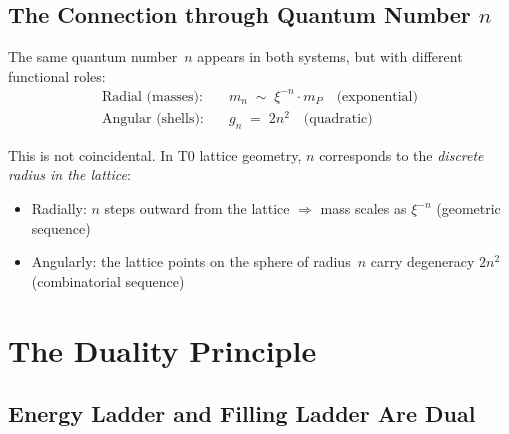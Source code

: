 \begin{table}[htbp]
\centering
\caption{Shell structure and the periodic table}
\label{tab:shells}
\end{table}

\subsection{The Connection through Quantum Number \texorpdfstring{$n$}{n}}
\label{subsec:connection-n}

The same quantum number~$n$ appears in both systems, but with different
functional roles:
\begin{align}
  \text{Radial (masses):}  &\quad m_n \;\sim\; \xi^{-n} \cdot m_P
    \quad\text{(exponential)} \\
  \text{Angular (shells):} &\quad g_n \;=\; 2n^2
    \quad\text{(quadratic)}
\end{align}

This is not coincidental. In T0 lattice geometry, $n$ corresponds to the
\emph{discrete radius in the lattice}:
\begin{itemize}
  \item Radially: $n$ steps outward from the lattice $\Rightarrow$
    mass scales as $\xi^{-n}$ (geometric sequence)
  \item Angularly: the lattice points on the sphere of radius~$n$ carry
    degeneracy $2n^2$ (combinatorial sequence)
\end{itemize}

\section{The Duality Principle}
\label{sec:duality}

\subsection{Energy Ladder and Filling Ladder Are Dual}
\label{subsec:dual}

